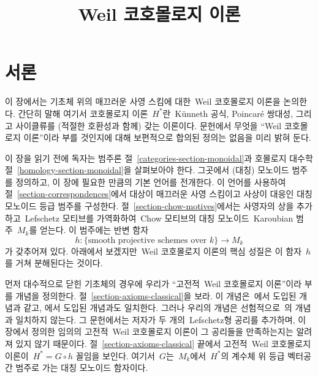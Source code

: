 

%


\title{Weil 코호몰로지 이론}


\maketitle

\label{section-phantom}

\tableofcontents



\section{서론}
\label{section-introduction}

\noindent
이 장에서는 기초체 위의 매끄러운 사영 스킴에 대한\  Weil 코호몰로지 이론을
논의한다. 간단히 말해 여기서 코호몰로지 이론\  $H^*$란\  K\"unneth 공식,
Poincar\'e 쌍대성, 그리고 사이클류를 (적절한 호환성과 함께) 갖는 이론이다.
문헌에서 무엇을 “Weil 코호몰로지 이론”이라 부를 것인지에 대해 보편적으로
합의된 정의는 없음을 미리 밝혀 둔다.

\medskip\noindent
이 장을 읽기 전에 독자는 범주론 절\ 
\ref{categories-section-monoidal}과 호몰로지 대수학 절\ 
\ref{homology-section-monoidal}을 살펴보아야 한다. 그곳에서 (대칭)
모노이드 범주를 정의하고, 이 장에 필요한 만큼의 기본 언어를 전개한다.
이 언어를 사용하여 절\  \ref{section-correspondences}에서 대상이 매끄러운
사영 스킴이고 사상이 대응인 대칭 모노이드 등급 범주를 구성한다.
절\  \ref{section-chow-motives}에서는 사영자의 상을 추가하고\  Lefschetz
모티브를 가역화하여\  Chow 모티브의 대칭 모노이드\  Karoubian 범주\  $M_k$를
얻는다. 이 범주에는 반변 함자
$$
h : \{\text{smooth projective schemes over }k\} \longrightarrow M_k
$$
가 갖추어져 있다. 아래에서 보겠지만\  Weil 코호몰로지 이론의 핵심 성질은
이 함자\  $h$를 거쳐 분해된다는 것이다.

\medskip\noindent
먼저 대수적으로 닫힌 기초체의 경우에 우리가 “고전적\  Weil 코호몰로지
이론”이라 부를 개념을 정의한다. 절\  \ref{section-axioms-classical}을
보라. 이 개념은\  \cite[Section 1.2]{Kleiman-cycles}에서 도입된 개념과
같고, \cite[page 65]{Kleiman-motives}에서 도입된 개념과도 일치한다.
그러나 우리의 개념은 선험적으로\  \cite[page 10]{Kleiman-standard}의
개념과 일치하지 않는다. 그 문헌에서는 저자가 두 개의\  Lefschetz형 공리를
추가하며, 이 장에서 정의한 임의의 고전적\  Weil 코호몰로지 이론이 그
공리들을 만족하는지는 알려져 있지 않기 때문이다.
절\  \ref{section-axioms-classical} 끝에서 고전적\  Weil 코호몰로지 이론이\ 
$H^* = G \circ h$ 꼴임을 보인다. 여기서\  $G$는\  $M_k$에서\  $H^*$의
계수체 위 등급 벡터공간 범주로 가는 대칭 모노이드 함자이다.

